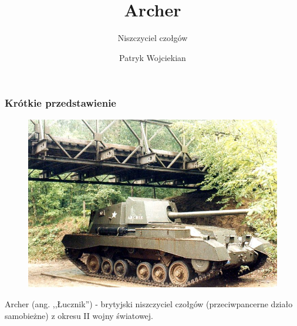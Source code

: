 \documentclass[]{beamer}
\author{Patryk Wojciekian}
\title{Archer}
\subtitle{Niszczyciel czołgów}
\date{}
\begin{document}
\begin{frame}
\maketitle
\end{frame}

\begin{frame}
\frametitle{Krótkie przedstawienie}
\begin{figure}[here]
\begin{center}
\includegraphics[scale=0.8]{Archer.jpg}
\end{center}
\end{figure}
Archer (ang. ,,Łucznik'') - brytyjski niszczyciel czołgów (przeciwpancerne działo samobieżne) z okresu II wojny światowej.
\end{frame}
\end{document}

